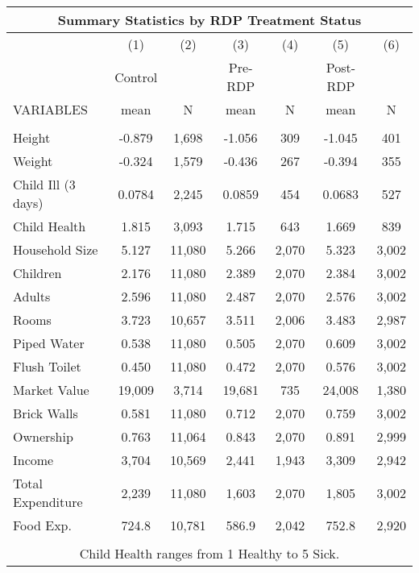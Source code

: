 \begin{tabular}{lcccccc}
\multicolumn{7}{c}{Summary Statistics by RDP Treatment Status} \\ \hline
 & (1) & (2) & (3) & (4) & (5) & (6) \\
 & Control &  & Pre-RDP &  & Post-RDP &  \\
VARIABLES & mean & N & mean & N & mean & N \\ \hline
 &  &  &  &  &  &  \\
Height & -0.879 & 1,698 & -1.056 & 309 & -1.045 & 401 \\
Weight & -0.324 & 1,579 & -0.436 & 267 & -0.394 & 355 \\
Child Ill (3 days) & 0.0784 & 2,245 & 0.0859 & 454 & 0.0683 & 527 \\
Child Health & 1.815 & 3,093 & 1.715 & 643 & 1.669 & 839 \\
Household Size & 5.127 & 11,080 & 5.266 & 2,070 & 5.323 & 3,002 \\
Children & 2.176 & 11,080 & 2.389 & 2,070 & 2.384 & 3,002 \\
Adults & 2.596 & 11,080 & 2.487 & 2,070 & 2.576 & 3,002 \\
Rooms & 3.723 & 10,657 & 3.511 & 2,006 & 3.483 & 2,987 \\
Piped Water & 0.538 & 11,080 & 0.505 & 2,070 & 0.609 & 3,002 \\
Flush Toilet & 0.450 & 11,080 & 0.472 & 2,070 & 0.576 & 3,002 \\
Market Value & 19,009 & 3,714 & 19,681 & 735 & 24,008 & 1,380 \\
Brick Walls & 0.581 & 11,080 & 0.712 & 2,070 & 0.759 & 3,002 \\
Ownership & 0.763 & 11,064 & 0.843 & 2,070 & 0.891 & 2,999 \\
Income & 3,704 & 10,569 & 2,441 & 1,943 & 3,309 & 2,942 \\
Total Expenditure & 2,239 & 11,080 & 1,603 & 2,070 & 1,805 & 3,002 \\
Food Exp. & 724.8 & 10,781 & 586.9 & 2,042 & 752.8 & 2,920 \\
 &  &  &  &  &  &  \\ \hline
\multicolumn{7}{c}{ Child Health ranges from 1 Healthy to 5 Sick.} \\
\end{tabular}
